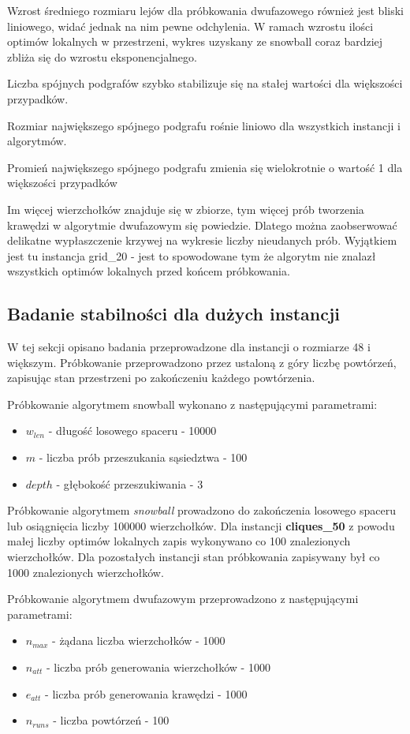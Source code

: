 Wzrost średniego rozmiaru lejów dla próbkowania dwufazowego również jest bliski liniowego,
widać jednak na nim pewne odchylenia. W ramach wzrostu ilości optimów lokalnych w przestrzeni,
wykres uzyskany ze snowball coraz bardziej zbliża się do wzrostu eksponencjalnego.

Liczba spójnych podgrafów szybko stabilizuje się na stałej wartości dla większości przypadków.

Rozmiar największego spójnego podgrafu rośnie liniowo dla wszystkich instancji i algorytmów.

Promień największego spójnego podgrafu zmienia się wielokrotnie o wartość 1 dla większości przypadków

Im więcej wierzchołków znajduje się w zbiorze, tym więcej prób tworzenia krawędzi w algorytmie dwufazowym
się powiedzie. Dlatego można zaobserwować delikatne wypłaszczenie krzywej na wykresie liczby nieudanych prób.
Wyjątkiem jest tu instancja grid\_20  - jest to spowodowane tym że algorytm nie znalazł wszystkich optimów
lokalnych przed końcem próbkowania.

\subsection{Badanie stabilności dla dużych instancji}
W tej sekcji opisano badania przeprowadzone dla instancji o rozmiarze 48 i większym.
Próbkowanie przeprowadzono przez ustaloną z góry liczbę powtórzeń, zapisując stan przestrzeni po zakończeniu każdego powtórzenia.

Próbkowanie algorytmem snowball wykonano z następującymi parametrami:
\begin{itemize}
    \item $w_{len}$ - długość losowego spaceru - 10000
    \item $m$ - liczba prób przeszukania sąsiedztwa - 100
    \item $depth$ - głębokość przeszukiwania - 3
\end{itemize}

Próbkowanie algorytmem \textit{snowball} prowadzono do zakończenia losowego spaceru lub osiągnięcia liczby 100000 wierzchołków.
Dla instancji \textbf{cliques\_50} z powodu małej liczby optimów lokalnych zapis wykonywano co 100 znalezionych wierzchołków.
Dla pozostałych instancji stan próbkowania zapisywany był co 1000 znalezionych wierzchołków.

Próbkowanie algorytmem dwufazowym przeprowadzono z następującymi parametrami:
\begin{itemize}
    \item $n_{max}$ - żądana liczba wierzchołków - 1000
    \item $n_{att}$ - liczba prób generowania wierzchołków - 1000
    \item $e_{att}$ - liczba prób generowania krawędzi - 1000
    \item $n_{runs}$ - liczba powtórzeń - 100
\end{itemize}

